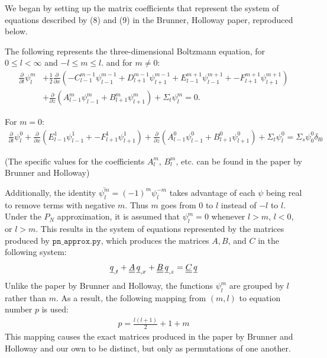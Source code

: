 
We began by setting up the matrix coefficients that represent the system of equations described by (8) and (9) in the Brunner, Holloway paper, reproduced below.

The following represents the three-dimensional Boltzmann equation, for $0 \leq l < \infty$ and $-l \leq m \leq l$.
and for $m \neq 0$:
\begin{align*}
	\frac{\partial}{\partial t}\psi_{l}^{m} &+ \frac{1}{2}\frac{\partial}{\partial x}
	(
	-C_{l-1}^{m-1}\psi_{l-1}^{m-1} + 
	D_{l+1}^{m-1}\psi_{l+1}^{m-1} + 
	E_{l-1}^{m+1}\psi_{l-1}^{m+1} + 
	-F_{l+1}^{m+1}\psi_{l+1}^{m+1} 
	)\\ &+ 
	\frac{\partial}{\partial z}
	(
	A_{l-1}^{m}\psi_{l-1}^{m} + 
	B_{l+1}^{m}\psi_{l+1}^{m}
	) + \Sigma_t\psi^{m}_{l} = 0.
\end{align*}

For $m = 0$:
\begin{align*}
	\frac{\partial}{\partial t}\psi_{l}^0 + 
	\frac{\partial}{\partial x}
	(
	E_{l-1}^{1}\psi_{l-1}^{1} + 
	-F_{l+1}^{1}\psi_{l+1}^{1} 
	) +  
	\frac{\partial}{\partial z}
	(
	A_{l-1}^{0}\psi_{l-1}^{0} + 
	B_{l+1}^{0}\psi_{l+1}^{0}
	) + \Sigma_t\psi^0_{l} = \Sigma_s\psi^0_0\delta_{l0}
\end{align*}

(The specific values for the coefficients $A_l^m$, $B_l^m$, etc. can be found in the paper by Brunner and Holloway)

Additionally, the identity $\bar{\psi_l^m} = (-1)^m\psi_l^{-m}$ takes advantage of each $\psi$ being real to remove terms with negative $m$.
Thus $m$ goes from $0$ to $l$ instead of $-l$ to $l$.
Under the $P_N$ approximation, it is assumed that $\psi_l^m = 0$ whenever $l > m$, $l < 0$, or $l > m$.
This results in the system of equations represented by the matrices produced by $\texttt{pn\_approx.py}$, which produces the matrices $A, B$, and $C$ in the following system:
\begin{align*}
	{\underline{q}}_{,t} + {\underline{\underline{A}}}\,{\underline{q}}_{,x} + {\underline{\underline{B}}}\,{\underline{q}}_{,z} = {\underline{\underline{C}}}\,{\underline{q}}
\end{align*}
Unlike the paper by Brunner and Holloway, the functions $\psi_l^m$ are grouped by $l$ rather than $m$.
As a result, the following mapping from $(m, l)$ to equation number $p$ is used:
\begin{align*}
	p = \frac{l(l+1)}{2} + 1 + m
\end{align*}
This mapping causes the exact matrices produced in the paper by Brunner and Holloway and our own to be distinct, but only as permutations of one another.
